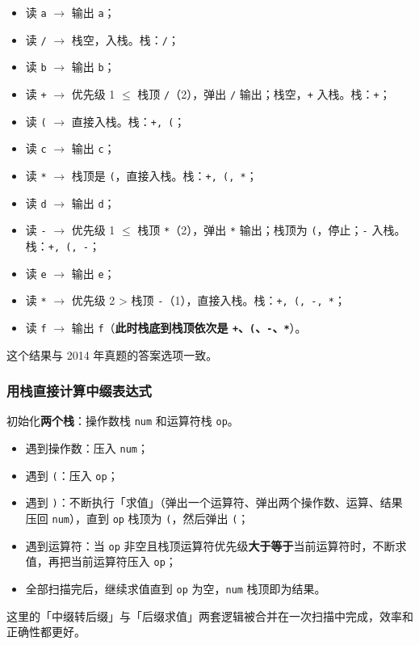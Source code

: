 \documentclass[11pt,openany,UTF8]{ctexbook}
\begin{document}
\begin{itemize}
\item 读 \texttt{a} $\to$ 输出 \texttt{a}；
\item 读 \texttt{/\allowbreak{}} $\to$ 栈空，入栈。栈：\texttt{/\allowbreak{}}；
\item 读 \texttt{b} $\to$ 输出 \texttt{b}；
\item 读 \texttt{+\allowbreak{}} $\to$ 优先级 1 $\le$ 栈顶 \texttt{/\allowbreak{}}（2），弹出 \texttt{/\allowbreak{}} 输出；栈空，\texttt{+\allowbreak{}} 入栈。栈：\texttt{+\allowbreak{}}；
\item 读 \texttt{(} $\to$ 直接入栈。栈：\texttt{+\allowbreak{},\allowbreak{} (}；
\item 读 \texttt{c} $\to$ 输出 \texttt{c}；
\item 读 \texttt{*} $\to$ 栈顶是 \texttt{(}，直接入栈。栈：\texttt{+\allowbreak{},\allowbreak{} (,\allowbreak{} *}；
\item 读 \texttt{d} $\to$ 输出 \texttt{d}；
\item 读 \texttt{-} $\to$ 优先级 1 $\le$ 栈顶 \texttt{*}（2），弹出 \texttt{*} 输出；栈顶为 \texttt{(}，停止；\texttt{-} 入栈。栈：\texttt{+\allowbreak{},\allowbreak{} (,\allowbreak{} -}；
\item 读 \texttt{e} $\to$ 输出 \texttt{e}；
\item 读 \texttt{*} $\to$ 优先级 2 > 栈顶 \texttt{-}（1），直接入栈。栈：\texttt{+\allowbreak{},\allowbreak{} (,\allowbreak{} -,\allowbreak{} *}；
\item 读 \texttt{f} $\to$ 输出 \texttt{f}（\textbf{此时栈底到栈顶依次是 \texttt{+\allowbreak{}}、\texttt{(}、\texttt{-}、\texttt{*}}）。
\end{itemize}
这个结果与 2014 年真题的答案选项一致。

\subsubsection{用栈直接计算中缀表达式}

初始化\textbf{两个栈}：操作数栈 \texttt{num} 和运算符栈 \texttt{op}。

\begin{itemize}
\item 遇到操作数：压入 \texttt{num}；
\item 遇到 \texttt{(}：压入 \texttt{op}；
\item 遇到 \texttt{)\allowbreak{}}：不断执行「求值」（弹出一个运算符、弹出两个操作数、运算、结果压回 \texttt{num}），直到 \texttt{op} 栈顶为 \texttt{(}，然后弹出 \texttt{(}；
\item 遇到运算符：当 \texttt{op} 非空且栈顶运算符优先级\textbf{大于等于}当前运算符时，不断求值，再把当前运算符压入 \texttt{op}；
\item 全部扫描完后，继续求值直到 \texttt{op} 为空，\texttt{num} 栈顶即为结果。
\end{itemize}
这里的「中缀转后缀」与「后缀求值」两套逻辑被合并在一次扫描中完成，效率和正确性都更好。
\end{document}
